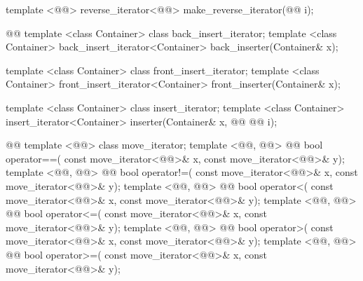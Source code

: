 \begin{codeblock}
  template <@@>
    reverse_iterator<@@> make_reverse_iterator(@@ i);

  @@
  template <class Container> class back_insert_iterator;
  template <class Container>
    back_insert_iterator<Container> back_inserter(Container& x);

  template <class Container> class front_insert_iterator;
  template <class Container>
    front_insert_iterator<Container> front_inserter(Container& x);

  template <class Container> class insert_iterator;
  template <class Container>
    insert_iterator<Container> inserter(Container& x, @@
      @@ i);

  @@
  template <@@> class move_iterator;
  template <@@, @@>
      @@
    bool operator==(
      const move_iterator<@@>& x, const move_iterator<@@>& y);
  template <@@, @@>
      @@
    bool operator!=(
      const move_iterator<@@>& x, const move_iterator<@@>& y);
  template <@@, @@>
      @@
    bool operator<(
      const move_iterator<@@>& x, const move_iterator<@@>& y);
  template <@@, @@>
      @@
    bool operator<=(
      const move_iterator<@@>& x, const move_iterator<@@>& y);
  template <@@, @@>
      @@
    bool operator>(
      const move_iterator<@@>& x, const move_iterator<@@>& y);
  template <@@, @@>
      @@
    bool operator>=(
      const move_iterator<@@>& x, const move_iterator<@@>& y);


\end{codeblock}
